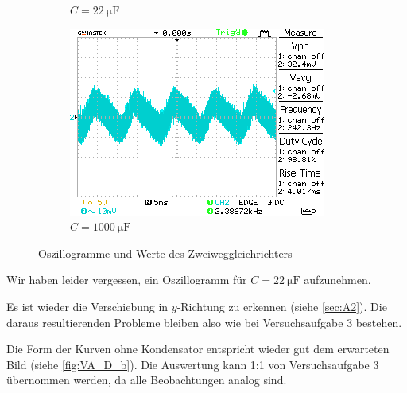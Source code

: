 \begin{figure}[H]
\begin{subfigure}[b]{0.45\textwidth}
        \caption{$C=\SI{22}{\micro\farad}$}
        \label{fig:4_C2}
    \end{subfigure}
    \hfill
    \begin{subfigure}[b]{0.45\textwidth}
        \includegraphics[width=\textwidth]{figs/4/DS0002.png}
        \caption{$C=\SI{1000}{\micro\farad}$}
        \label{fig:4_C3}
    \end{subfigure}
    \caption{Oszillogramme und Werte des Zweiweggleichrichters}
\end{figure}


Wir haben leider vergessen, ein Oszillogramm für $C=\SI{22}{\micro\farad}$ aufzunehmen.

Es ist wieder die Verschiebung in $y$-Richtung zu erkennen (siehe \ref{sec:A2}).
Die daraus resultierenden Probleme bleiben also wie bei Versuchsaufgabe 3 bestehen.

Die Form der Kurven ohne Kondensator entspricht wieder gut dem erwarteten Bild (siehe \ref{fig:VA_D_b}).
Die Auswertung kann 1:1 von Versuchsaufgabe 3 übernommen werden, da alle Beobachtungen analog sind.